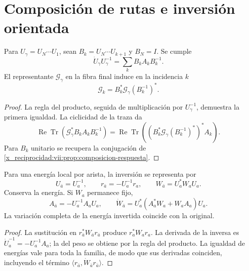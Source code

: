 \section{Composición de rutas e inversión orientada}

\begin{proposition}
\label{x_reciprocidad:vii:prop:pullback-invertible}
Para \(U_\gamma=U_N\cdots U_1\), sean
\(B_k=U_N\cdots U_{k+1}\) y \(B_N=I\). Se cumple
\[
 \dot U_\gamma U_\gamma^{-1}
   =\sum_kB_kA_kB_k^{-1}.
\]
El representante \(\mathcal G_\gamma\) en la fibra final induce
en la incidencia \(k\)
\begin{equation}
 \mathcal G_k=B_k^*\mathcal G_\gamma(B_k^{-1})^*.
 \label{x_reciprocidad:vii:eq:transporte-contragrediente}
\end{equation}
\end{proposition}

\begin{proof}
La regla del producto, seguida de multiplicación por
\(U_\gamma^{-1}\), demuestra la primera igualdad. La ciclicidad
de la traza da
\[
 \operatorname{Re}\operatorname{Tr}
  (\mathcal G_\gamma^*B_kA_kB_k^{-1})
 =\operatorname{Re}\operatorname{Tr}
  ((B_k^*\mathcal G_\gamma(B_k^{-1})^*)^*A_k).
\]
Para \(B_k\) unitario se recupera la conjugación de
\ref{x_reciprocidad:vii:prop:composicion-respuesta}.
\end{proof}

\begin{proposition}
\label{x_reciprocidad:vii:prop:inversion-congruencia}
Para una energía local por arista, la inversión se representa por
\begin{equation}
 U_{\bar a}=U_a^{-1},\qquad
 r_{\bar a}=-U_a^{-1}r_a,\qquad
 W_{\bar a}=U_a^*W_aU_a.
 \label{x_reciprocidad:vii:eq:inversion-peso-general}
\end{equation}
Conserva la energía. Si \(W_a\) permanece fijo,
\[
 A_{\bar a}=-U_a^{-1}A_aU_a,\qquad
 \dot W_{\bar a}=U_a^*(A_a^*W_a+W_aA_a)U_a.
\]
La variación completa de la energía invertida coincide con la original.
\end{proposition}

\begin{proof}
La sustitución en \(r_{\bar a}^*W_{\bar a}r_{\bar a}\)
produce \(r_a^*W_ar_a\). La derivada de la inversa es
\(\dot U_a^{-1}=-U_a^{-1}A_a\); la del peso se obtiene por
la regla del producto. La igualdad de energías vale para toda la
familia, de modo que sus derivadas coinciden, incluyendo el término
\(\langle r_{\bar a},\dot W_{\bar a}r_{\bar a}\rangle\).
\end{proof}

